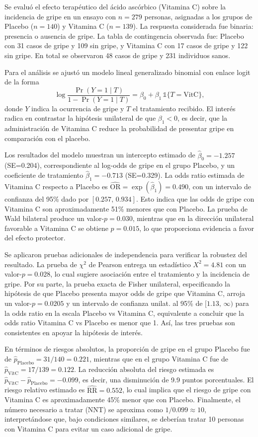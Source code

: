 Se evaluó el efecto terapéutico del ácido ascórbico (Vitamina C) sobre la incidencia de gripe en un ensayo con $n=279$ personas, asignadas a los grupos de Placebo ($n=140$) y Vitamina C ($n=139$). La respuesta considerada fue binaria: presencia o ausencia de gripe. La tabla de contingencia observada fue: Placebo con 31 casos de gripe y 109 sin gripe, y Vitamina C con 17 casos de gripe y 122 sin gripe. En total se observaron 48 casos de gripe y 231 individuos sanos.

Para el análisis se ajustó un modelo lineal generalizado binomial con enlace logit de la forma
\[
\log \frac{\Pr(Y=1 \mid T)}{1 - \Pr(Y=1 \mid T)} = \beta_0 + \beta_1 \,\mathbb{1}\{T=\text{VitC}\},
\]
donde $Y$ indica la ocurrencia de gripe y $T$ el tratamiento recibido. El interés radica en contrastar la hipótesis unilateral de que $\beta_1 < 0$, es decir, que la administración de Vitamina C reduce la probabilidad de presentar gripe en comparación con el placebo. 

Los resultados del modelo muestran un intercepto estimado de $\hat\beta_0=-1.257$ (SE=0.204), correspondiente al log-odds de gripe en el grupo Placebo, y un coeficiente de tratamiento $\hat\beta_1=-0.713$ (SE=0.329). La odds ratio estimada de Vitamina C respecto a Placebo es $\widehat{\text{OR}}=\exp(\hat\beta_1)=0.490$, con un intervalo de confianza del 95\% dado por $[0.257,\,0.934]$. Esto indica que las odds de gripe con Vitamina C son aproximadamente 51\% menores que con Placebo. La prueba de Wald bilateral produce un valor-$p=0.030$, mientras que en la dirección unilateral favorable a Vitamina C se obtiene $p=0.015$, lo que proporciona evidencia a favor del efecto protector.

Se aplicaron pruebas adicionales de independencia para verificar la robustez del resultado. La prueba de $\chi^2$ de Pearson entrega un estadístico $X^2=4.81$ con un valor-$p=0.028$, lo cual sugiere asociación entre el tratamiento y la incidencia de gripe. Por su parte, la prueba exacta de Fisher unilateral, especificando la hipótesis de que Placebo presenta mayor odds de gripe que Vitamina C, arroja un valor-$p=0.0205$ y un intervalo de confianza unilat. al 95\% de $[1.13,\,\infty)$ para la odds ratio en la escala Placebo vs Vitamina C, equivalente a concluir que la odds ratio Vitamina C vs Placebo es menor que 1. Así, las tres pruebas son consistentes en apoyar la hipótesis de interés.

En términos de riesgos absolutos, la proporción de gripe en el grupo Placebo fue de $\hat p_{\text{Placebo}}=31/140=0.221$, mientras que en el grupo Vitamina C fue de $\hat p_{\text{VitC}}=17/139=0.122$. La reducción absoluta del riesgo estimada es $\hat p_{\text{VitC}} - \hat p_{\text{Placebo}} = -0.099$, es decir, una disminución de 9.9 puntos porcentuales. El riesgo relativo estimado es $\widehat{\text{RR}} = 0.552$, lo cual implica que el riesgo de gripe con Vitamina C es aproximadamente 45\% menor que con Placebo. Finalmente, el número necesario a tratar (NNT) se aproxima como $1/0.099 \approx 10$, interpretándose que, bajo condiciones similares, se deberían tratar 10 personas con Vitamina C para evitar un caso adicional de gripe.


